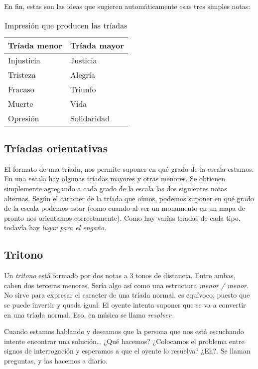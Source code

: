 \documentclass[]{article}
\begin{document}
En fin, estas son las ideas que sugieren automáticamente esas tres simples notas:

\begin{table}[htbp]
  \centering
  \begin{tabular}{ll}
    \toprule
    \textbf{Tríada menor} & \textbf{Tríada mayor} \\
    \midrule
    Injusticia  & Justicia \\
    Tristeza    & Alegría \\
    Fracaso & Triunfo \\
    Muerte  & Vida \\
    Opresión    & Solidaridad \\
    \bottomrule
  \end{tabular}
  \caption{Impresión que producen las tríadas}\label{tab:triad-impressions}
\end{table}

\subsection{Tríadas orientativas}

El formato de una tríada, nos permite suponer en qué grado de la escala estamos. En una escala hay algunas tríadas mayores y otras menores. Se obtienen simplemente agregando a cada grado de la escala las dos siguientes notas alternas. Según el caracter de la tríada que oímos, podemos suponer en qué grado de la escala podemos estar (como cuando al ver un monumento en un mapa de pronto nos orientamos correctamente). Como hay varias tríadas de cada tipo, todavía hay \emph{lugar para el engaño}.

\subsection{Tritono}

Un \emph{tritono} está formado por dos notas a 3 tonos de distancia. Entre ambas, caben dos terceras menores. Sería algo así como una estructura \emph{menor / menor}. No sirve para expresar el caracter de una tríada normal, es equívoco, puesto que se puede invertir y queda igual. El oyente intenta suponer que se va a convertir en una tríada normal. Eso, en música se llama \emph{resolver}.

Cuando estamos hablando y deseamos que la persona que nos está escuchando intente encontrar una solución\ldots{} ¿Qué hacemos? ¿Colocamos el problema entre signos de interrogación y esperamos a que el oyente lo resuelva? ¿Eh?. Se llaman preguntas, y las hacemos a diario.
\end{document}

